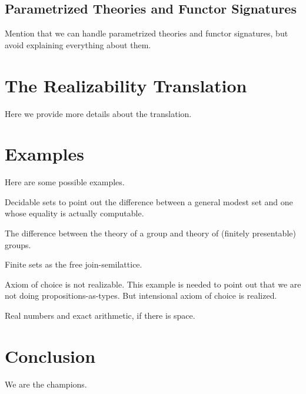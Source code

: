 \documentclass{article}
\begin{document}
\subsection{Parametrized Theories and Functor Signatures}
\label{sec:param-theor-funct}


Mention that we can handle parametrized theories and functor
signatures, but avoid explaining everything about them.

\section{The Realizability Translation}
\label{sec:real-transl}

Here we provide more details about the translation.

\section{Examples}
\label{sec:examples}

Here are some possible examples.

Decidable sets to point out the difference between a general modest
set and one whose equality is actually computable.

The difference between the theory of a group and theory of (finitely
presentable) groups.

Finite sets as the free join-semilattice.

Axiom of choice is not realizable. This example is needed to point out
that we are not doing propositions-as-types. But intensional axiom of
choice is realized.

Real numbers and exact arithmetic, if there is space.

\section{Conclusion}
\label{sec:conclusion}

We are the champions.





\end{document}

